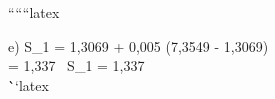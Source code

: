 ``````latex

e) \quad S_1 = 1,3069 + 0,005 (7,3549 - 1,3069) \\
\quad \quad \quad = 1,337 \,  \quad \Rightarrow \quad S_1 = 1,337 \,  \\
\quad \quad \quad \quad \quad \quad \quad \quad \quad \quad \quad \quad \quad \quad \quad \quad \quad \quad \quad \quad \quad \quad \quad \quad \quad \quad \quad \quad \quad \quad \quad \quad \quad \quad \quad \quad \quad \quad \quad \quad \quad \quad \quad \quad \quad \quad \quad \quad \quad \quad \quad \quad \quad \quad \quad \quad \quad \quad \quad \quad \quad \quad \quad \quad \quad \quad \quad \quad \quad \quad \quad \quad \quad \quad \quad \quad \quad \quad \quad \quad \quad \quad \quad \quad \quad \quad \quad \quad \quad \quad \quad \quad \quad \quad \quad \quad \quad \quad \quad \quad \quad \quad \quad \quad \quad \quad \quad \quad \quad \quad \quad \quad \quad \quad \quad \quad \quad \quad \quad \quad \quad \quad \quad \quad \quad \quad \quad \quad \quad \quad \quad \quad \quad \quad \quad \quad \quad \quad \quad \quad \quad \quad \quad \quad \quad \quad \quad \quad \quad \quad \quad \quad \quad \quad \quad \quad \quad \quad \quad \quad \quad \quad \quad \quad \quad \quad \quad \quad \quad \quad \quad \quad \quad \quad \quad \quad \quad \quad \quad \quad \quad \quad \quad \quad \quad \quad \quad \quad \quad \quad \quad \quad \quad \quad \quad \quad \quad \quad \quad \quad \quad \quad \quad \quad \quad \quad \quad \quad \quad \quad \quad \quad \quad \quad \quad \quad \quad \quad \quad \quad \quad \quad \quad \quad \quad \quad \quad \quad \quad \quad \quad \quad \quad \quad \quad \quad \quad \quad \quad \quad \quad \quad \quad \quad \quad \quad \quad \quad \quad \quad \quad \quad \quad \quad \quad \quad \quad \quad \quad \quad \quad \quad \quad \quad \quad \quad \quad \quad \quad \quad \quad \quad \quad \quad \quad \quad \quad \quad \quad \quad \quad \quad \quad \quad \quad \quad \quad \quad \quad \quad \quad \quad \quad \quad \quad \quad \quad \quad \quad \quad \quad \quad \quad \quad \quad \quad \quad \quad \quad \quad \quad \quad \quad \quad \quad \quad \quad \quad \quad \quad \quad \quad \quad \quad \quad \quad \quad \quad \quad \quad \quad \quad \quad \quad \quad \quad \quad \quad \quad \quad \quad \quad \quad \quad \quad \quad \quad \quad \quad \quad \quad \quad \quad \quad \quad \quad \quad \quad \quad \quad \quad \quad \quad \quad \quad \quad \quad \quad \quad \quad \quad \quad \quad \quad \quad \quad \quad \quad \quad \quad \quad \quad \quad \quad \quad \quad \quad \quad \quad \quad \quad \quad \quad \quad \quad \quad \quad \quad \quad \quad \quad \quad \quad \quad \quad \quad \quad \quad \quad \quad \quad \quad \quad \quad \quad \quad \quad \quad \quad \quad \quad \quad \quad \quad \quad \quad \quad \quad \quad \quad \quad \quad \quad \quad \quad \quad \quad \quad \quad \quad \quad \quad \quad \quad \```latex


